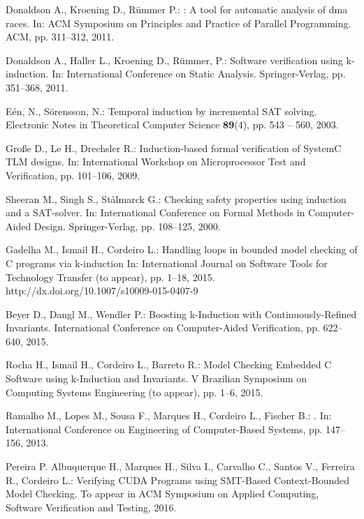 \documentclass{acm_sen_article}
\begin{document}
\begin{thebibliography}{1}
Donaldson A., Kroening D., R{\"{u}}mmer P.:
: A tool for automatic analysis of dma races.
\newblock In: ACM Symposium on Principles and Practice of Parallel Programming. ACM, pp. 311--312, 2011.

Donaldson A., Haller L., Kroening D., R{\"{u}}mmer, P.:
\newblock Software verification using k-induction.
\newblock In: International Conference on Static Analysis. Springer-Verlag, pp. 351--368, 2011.

E{\'{e}}n, N., S{\"{o}}rensson, N.:
\newblock Temporal induction by incremental {SAT} solving.
\newblock Electronic Notes in Theoretical Computer Science \textbf{89}(4), pp. 543 -- 560, 2003.

Gro{\ss}e D., Le H., Drechsler R.:
\newblock Induction-based formal verification of {SystemC TLM} designs.
\newblock In: International Workshop on Microprocessor Test and Verification, pp. 101--106, 2009.

Sheeran M., Singh S., St{\aa}lmarck G.:
\newblock Checking safety properties using induction and a {SAT}-solver.
\newblock In: International Conference on Formal Methods in Computer-Aided Design. Springer-Verlag, pp. 108--125, 2000.

Gadelha M., Ismail H., Cordeiro L.:
\newblock Handling loops in bounded model checking of C programs via k-induction
\newblock In: International Journal on Software Tools for Technology Transfer (to appear), pp. 1--18, 2015.
\newblock http://dx.doi.org/10.1007/s10009-015-0407-9

Beyer D., Dangl M., Wendler P.:
\newblock Boosting k-Induction with Continuously-Refined Invariants.
\newblock International Conference on Computer-Aided Verification, pp. 622--640, 2015.

Rocha H., Ismail H., Cordeiro L., Barreto R.:
\newblock Model Checking Embedded C Software using k-Induction and Invariants. 
\newblock V Brazilian Symposium on Computing Systems Engineering (to appear), pp. 1--6, 2015.

Ramalho M., Lopes M., Sousa F., Marques H., Cordeiro L., Fischer B.:
.
\newblock In: International Conference on Engineering of Computer-Based Systems, pp. 147--156, 2013.

Pereira P.  Albuquerque H., Marques H., Silva I., Carvalho C., Santos V., Ferreira R., Cordeiro L.: 
\newblock Verifying CUDA Programs using SMT-Based Context-Bounded Model Checking. 
\newblock To appear in ACM Symposium on Applied Computing, Software Verification and Testing, 2016. 


\end{thebibliography}
\end{document}
